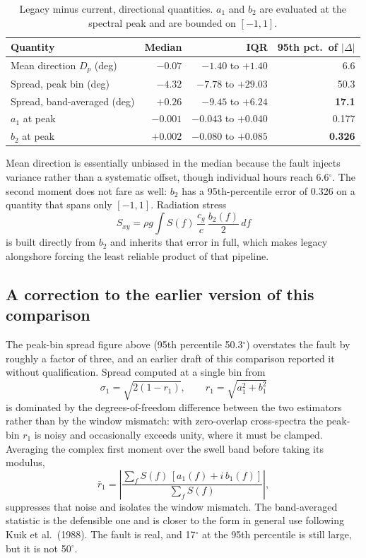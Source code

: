 \documentclass[11pt]{article}
\begin{document}
\begin{table}[htbp]
  \centering
  \caption{Legacy minus current, directional quantities. $a_1$ and $b_2$ are
  evaluated at the spectral peak and are bounded on $[-1,1]$.}
  \begin{tabular}{@{}lrrr@{}}
    \toprule
    Quantity & Median & IQR & 95th pct.\ of $|\Delta|$ \\
    \midrule
    Mean direction $D_p$ (deg)      & $-0.07$ & $-1.40$ to $+1.40$ & 6.6 \\
    Spread, peak bin (deg)          & $-4.32$ & $-7.78$ to $+29.03$ & 50.3 \\
    Spread, band-averaged (deg)     & $+0.26$ & $-9.45$ to $+6.24$ & \textbf{17.1} \\
    $a_1$ at peak                   & $-0.001$ & $-0.043$ to $+0.040$ & 0.177 \\
    $b_2$ at peak                   & $+0.002$ & $-0.080$ to $+0.085$ & \textbf{0.326} \\
    \bottomrule
  \end{tabular}
\end{table}

Mean direction is essentially unbiased in the median because the fault injects
variance rather than a systematic offset, though individual hours reach
6.6$^\circ$. The second moment does not fare as well: $b_2$ has a
95th-percentile error of 0.326 on a quantity that spans only $[-1,1]$. Radiation
stress
\begin{equation}
    S_{xy} = \rho g \int S(f)\, \frac{c_g}{c}\, \frac{b_2(f)}{2}\, df
\end{equation}
is built directly from $b_2$ and inherits that error in full, which makes legacy
alongshore forcing the least reliable product of that pipeline.

\subsection*{A correction to the earlier version of this comparison}

The peak-bin spread figure above (95th percentile 50.3$^\circ$) overstates the
fault by roughly a factor of three, and an earlier draft of this comparison
reported it without qualification. Spread computed at a single bin from
\begin{equation}
    \sigma_1 = \sqrt{2\left(1 - r_1\right)}, \qquad r_1 = \sqrt{a_1^2 + b_1^2}
\end{equation}
is dominated by the degrees-of-freedom difference between the two estimators
rather than by the window mismatch: with zero-overlap cross-spectra the peak-bin
$r_1$ is noisy and occasionally exceeds unity, where it must be clamped.
Averaging the complex first moment over the swell band before taking its
modulus,
\begin{equation}
    \bar r_1 = \left| \frac{\sum_f S(f)\,[a_1(f) + i\,b_1(f)]}{\sum_f S(f)} \right|,
\end{equation}
suppresses that noise and isolates the window mismatch. The band-averaged
statistic is the defensible one and is closer to the form in general use
following Kuik et al.\ (1988). The fault is real, and 17$^\circ$ at the 95th
percentile is still large, but it is not 50$^\circ$.
\end{document}
